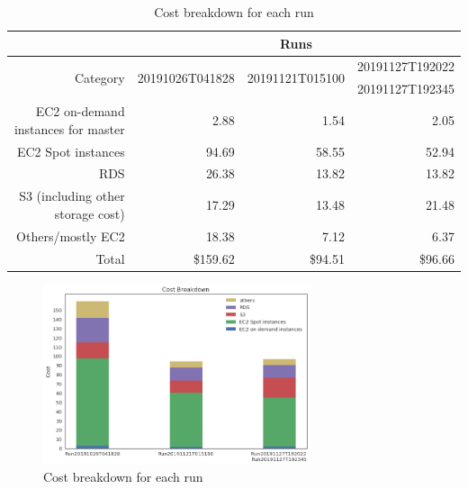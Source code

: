 \begin{table}[h!]
\centering
\begin{tabular} {|r|r|r|r|}
\hline
{}&\multicolumn{3}{c|}{Runs} \\ \hline
\multirow{2}{*}{Category}&\multirow{2}{*}{20191026T041828}&\multirow{2}{*}{20191121T015100}&{20191127T192022}\\
&&&{20191127T192345}\\ \hline
{EC2 on-demand instances for master}& 2.88 &1.54 &2.05\\
{EC2 Spot instances}&94.69&58.55 &52.94\\
{RDS}&26.38&13.82 & 13.82\\
{S3 (including other storage cost)}&17.29&13.48& 21.48\\
{Others/mostly EC2}&18.38 &7.12 &6.37\\ \hline
{Total}&\$159.62&\$94.51&\$96.66\\ \hline
\end{tabular} \normalsize
\caption{Cost breakdown for each run}
\label{tab:billBreakdown}
\end{table}

\begin{figure}[h]
\centering
\includegraphics[width=0.7\textwidth]{figures/billBreakdown.png}
\caption{Cost breakdown for each run}
\label{fig:billBreakdown}
\end{figure}
